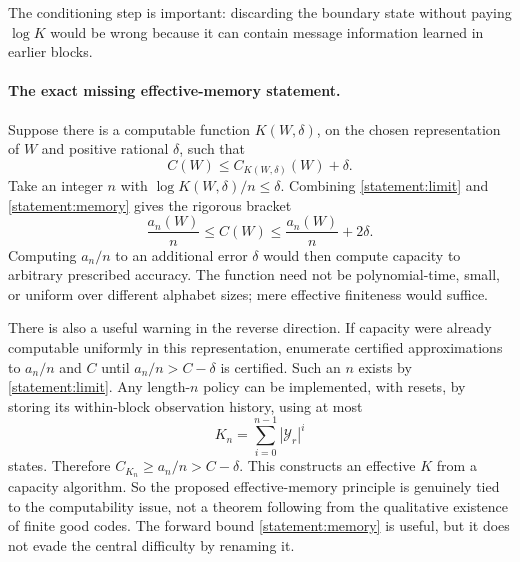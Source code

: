 \documentclass[11pt,a4paper]{article}
\numberwithin{equation}{section}
\begin{document}
The conditioning step is important: discarding the boundary state
without paying $\log K$ would be wrong because it can contain message
information learned in earlier blocks.

\paragraph{The exact missing effective-memory statement.}
Suppose there is a computable function $K(W,\delta)$, on the chosen
representation of $W$ and positive rational $\delta$, such that
\begin{equation}\label{statement:modulus}
 C(W)\leq C_{K(W,\delta)}(W)+\delta.
\end{equation}
Take an integer $n$ with $\log K(W,\delta)/n\leq\delta$. Combining
\eqref{statement:limit} and \eqref{statement:memory} gives the rigorous bracket
\begin{equation}
 \frac{a_n(W)}n\leq C(W)
 \leq\frac{a_n(W)}n+2\delta.
\end{equation}
Computing $a_n/n$ to an additional error $\delta$ would then compute
capacity to arbitrary prescribed accuracy. The function need not be
polynomial-time, small, or uniform over different alphabet sizes; mere
effective finiteness would suffice.

There is also a useful warning in the reverse direction. If capacity
were already computable uniformly in this representation, enumerate
certified approximations to $a_n/n$ and $C$ until
$a_n/n>C-\delta$ is certified. Such an $n$ exists by
\eqref{statement:limit}. Any length-$n$ policy can be implemented, with resets,
by storing its within-block observation history, using at most
\begin{equation}
 K_n=\sum_{i=0}^{n-1}|\mathcal Y_r|^i
\end{equation}
states. Therefore $C_{K_n}\geq a_n/n>C-\delta$. This constructs an
effective $K$ from a capacity algorithm. So the proposed effective-memory
principle is genuinely tied to the computability issue, not a theorem
following from the qualitative existence of finite good codes. The
forward bound \eqref{statement:memory} is useful, but it does not evade the
central difficulty by renaming it.
\end{document}

